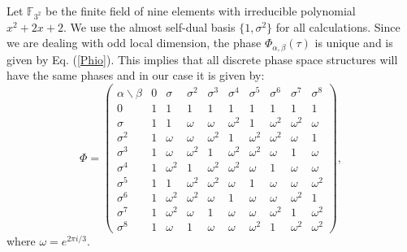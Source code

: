\documentclass[a4paper]{article}
\begin{document}
  Let $\mathbb F_{3^2}$ be the finite field of nine elements
  with irreducible polynomial $x^2 + 2x + 2$. We use the
  almost self-dual basis $\{1, \sigma^2\}$ for all
  calculations. Since we are dealing with odd local
  dimension, the phase $\Phi_{\alpha,\beta}(\tau)$ is unique
  and is given by Eq. (\ref{Phio}). This implies that all
  discrete phase space structures will have the same phases
  and in our case it is given by:
  \begin{equation}
    \Phi =
    \displaystyle \left(\begin{array}{rrrrrrrrrr}
    \alpha \backslash \beta & 0 & \sigma & \sigma^2 &
    \sigma^3 & \sigma^4 & \sigma^5 & \sigma^6 & \sigma^7 & \sigma^8 \\
    0 & 1 & 1 & 1 & 1 & 1 & 1 & 1 & 1 & 1 \\
    \sigma & 1 & 1 & \omega & \omega & \omega^{2} & 1 & \omega^{2} & \omega^{2} & \omega \\
    \sigma^2 & 1 & \omega & \omega & \omega^{2} & 1 & \omega^{2} & \omega^{2} & \omega & 1 \\
    \sigma^3 & 1 & \omega & \omega^{2} & 1 & \omega^{2} & \omega^{2} & \omega & 1 & \omega \\
    \sigma^4 & 1 & \omega^{2} & 1 & \omega^{2} & \omega^{2} & \omega & 1 & \omega & \omega \\
    \sigma^5 & 1 & 1 & \omega^{2} & \omega^{2} & \omega & 1 & \omega & \omega & \omega^{2} \\
    \sigma^6 & 1 & \omega^{2} & \omega^{2} & \omega & 1 & \omega & \omega & \omega^{2} & 1 \\
    \sigma^7 & 1 & \omega^{2} & \omega & 1 & \omega & \omega & \omega^{2} & 1 & \omega^{2} \\
    \sigma^8 & 1 & \omega & 1 & \omega & \omega & \omega^{2} & 1 & \omega^{2} & \omega^{2}
    \end{array}\right),
  \end{equation}
  where $\omega = e^{2\pi i / 3}$. 

  
\end{document}
